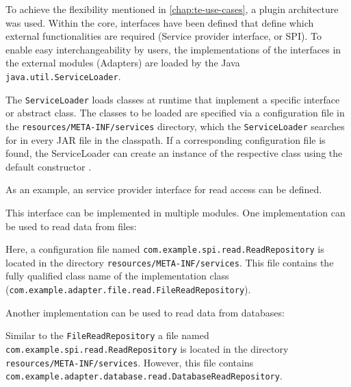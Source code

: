 To achieve the flexibility mentioned in \autoref{chap:te-use-cases}, a plugin architecture was used. Within the core, interfaces have been defined that define which external functionalities are required (Service provider interface, or SPI). To enable easy interchangeability by users, the implementations of the interfaces in the external modules (Adapters) are loaded by the Java \verb|java.util.ServiceLoader|.

The \verb|ServiceLoader| loads classes at runtime that implement a specific interface or abstract class. The classes to be loaded are specified via a configuration file in the \verb|resources/META-INF/services| directory, which the \verb|ServiceLoader| searches for in every JAR file in the classpath. If a corresponding configuration file is found, the ServiceLoader can create an instance of the respective class using the default constructor \cite{java-service-loader}.

As an example, an service provider interface for read access can be defined.



This interface can be implemented in multiple modules. One implementation can be used to read data from files:



Here, a configuration file named \verb|com.example.spi.read.ReadRepository| is located in the directory \verb|resources/META-INF/services|. This file contains the fully qualified class name of the implementation class \\(\verb|com.example.adapter.file.read.FileReadRepository|).

Another implementation can be used to read data from databases:



Similar to the \verb|FileReadRepository| a file named \\\verb|com.example.spi.read.ReadRepository| is located in the directory \\\verb|resources/META-INF/services|. However, this file contains \\\verb|com.example.adapter.database.read.DatabaseReadRepository|.

